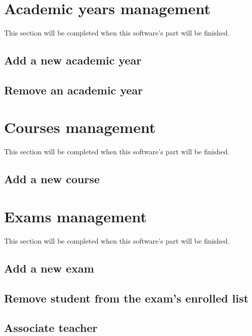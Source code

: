 \documentclass[ManualeUtente.tex]{subfiles}
\begin{document}
\section{Academic years management}
This section will be completed when this software's part will be finished.
\subsection{Add a new academic year}
\subsection{Remove an academic year}

\section{Courses management}
This section will be completed when this software's part will be finished.
\subsection{Add a new course}

\section{Exams management}
This section will be completed when this software's part will be finished.
\subsection{Add a new exam}
\subsection{Remove student from the exam's enrolled list}
\subsection{Associate teacher}
\end{document}
